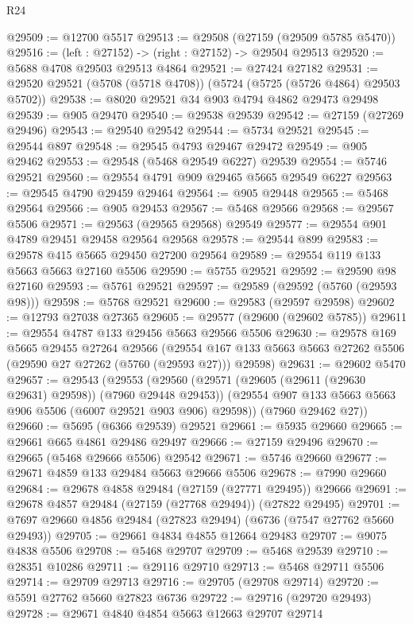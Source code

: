 \begin{lexlean}{R24}
\begin{coremodule}
@29509 := @12700 @5517
@29513 := @29508 (@27159 (@29509 @5785 @5470))
@29516 := (left : @27152) -> (right : @27152) -> @29504 @29513
@29520 := @5688 @4708 @29503 @29513 @4864
@29521 := @27424 @27182
@29531 := @29520 @29521 (@5708 (@5718 @4708)) (@5724 (@5725 (@5726 @4864) @29503 @5702))
@29538 := @8020 @29521 @34 @903 @4794 @4862 @29473 @29498
@29539 := @905 @29470
@29540 := @29538 @29539
@29542 := @27159 (@27269 @29496)
@29543 := @29540 @29542
@29544 := @5734 @29521
@29545 := @29544 @897
@29548 := @29545 @4793 @29467 @29472
@29549 := @905 @29462
@29553 := @29548 (@5468 @29549 @6227) @29539
@29554 := @5746 @29521
@29560 := @29554 @4791 @909 @29465 @5665 @29549 @6227
@29563 := @29545 @4790 @29459 @29464
@29564 := @905 @29448
@29565 := @5468 @29564
@29566 := @905 @29453
@29567 := @5468 @29566
@29568 := @29567 @5506
@29571 := @29563 (@29565 @29568) @29549
@29577 := @29554 @901 @4789 @29451 @29458 @29564 @29568
@29578 := @29544 @899
@29583 := @29578 @415 @5665 @29450 @27200 @29564
@29589 := @29554 @119 @133 @5663 @5663 @27160 @5506
@29590 := @5755 @29521
@29592 := @29590 @98 @27160
@29593 := @5761 @29521
@29597 := @29589 (@29592 (@5760 (@29593 @98)))
@29598 := @5768 @29521
@29600 := @29583 (@29597 @29598)
@29602 := @12793 @27038 @27365
@29605 := @29577 (@29600 (@29602 @5785))
@29611 := @29554 @4787 @133 @29456 @5663 @29566 @5506
@29630 := @29578
    @169
    @5665
    @29455
    @27264
    @29566
    (@29554 @167 @133 @5663 @5663 @27262 @5506 (@29590 @27 @27262 (@5760 (@29593 @27))) @29598)
@29631 := @29602 @5470
@29657 := @29543
    (@29553
      (@29560
        (@29571 (@29605 (@29611 (@29630 @29631) @29598)) (@7960 @29448 @29453))
        (@29554 @907 @133 @5663 @5663 @906 @5506 (@6007 @29521 @903 @906) @29598))
      (@7960 @29462 @27))
@29660 := @5695 (@6366 @29539) @29521
@29661 := @5935 @29660
@29665 := @29661 @665 @4861 @29486 @29497
@29666 := @27159 @29496
@29670 := @29665 (@5468 @29666 @5506) @29542
@29671 := @5746 @29660
@29677 := @29671 @4859 @133 @29484 @5663 @29666 @5506
@29678 := @7990 @29660
@29684 := @29678 @4858 @29484 (@27159 (@27771 @29495)) @29666
@29691 := @29678 @4857 @29484 (@27159 (@27768 @29494)) (@27822 @29495)
@29701 := @7697 @29660 @4856 @29484 (@27823 @29494) (@6736 (@7547 @27762 @5660 @29493))
@29705 := @29661 @4834 @4855 @12664 @29483
@29707 := @9075 @4838 @5506
@29708 := @5468 @29707
@29709 := @5468 @29539
@29710 := @28351 @10286
@29711 := @29116 @29710
@29713 := @5468 @29711 @5506
@29714 := @29709 @29713
@29716 := @29705 (@29708 @29714)
@29720 := @5591 @27762 @5660 @27823 @6736
@29722 := @29716 (@29720 @29493)
@29728 := @29671 @4840 @4854 @5663 @12663 @29707 @29714

\end{coremodule}
\end{lexlean}
